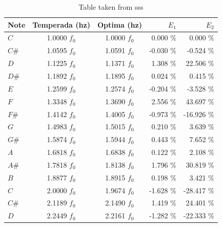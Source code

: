 \documentclass{article}
\begin{document}
\begin{table}[h]
\center
\begin{tabular}{|l||c|c||r|r|}
\hline 
Note & Temperada (hz)& Optima (hz) & $E_1$ & $E_2$ \\ \hline
\hline 
    $C$ & 1.0000 $f_0$ & 1.0000 $f_0$ &  0.000 \% &   0.000 \% \\ \hline 
  $C\#$ & 1.0595 $f_0$ & 1.0591 $f_0$ & -0.030 \% &  -0.524 \% \\ \hline 
    $D$ & 1.1225 $f_0$ & 1.1371 $f_0$ &  1.308 \% &  22.506 \% \\ \hline 
  $D\#$ & 1.1892 $f_0$ & 1.1895 $f_0$ &  0.024 \% &   0.415 \% \\ \hline 
    $E$ & 1.2599 $f_0$ & 1.2574 $f_0$ & -0.204 \% &  -3.528 \% \\ \hline 
    $F$ & 1.3348 $f_0$ & 1.3690 $f_0$ &  2.556 \% &  43.697 \% \\ \hline 
  $F\#$ & 1.4142 $f_0$ & 1.4005 $f_0$ & -0.973 \% & -16.926 \% \\ \hline 
    $G$ & 1.4983 $f_0$ & 1.5015 $f_0$ &  0.210 \% &   3.639 \% \\ \hline 
  $G\#$ & 1.5874 $f_0$ & 1.5944 $f_0$ &  0.443 \% &   7.652 \% \\ \hline 
    $A$ & 1.6818 $f_0$ & 1.6838 $f_0$ &  0.122 \% &   2.108 \% \\ \hline 
  $A\#$ & 1.7818 $f_0$ & 1.8138 $f_0$ &  1.796 \% &  30.819 \% \\ \hline 
    $B$ & 1.8877 $f_0$ & 1.8915 $f_0$ &  0.198 \% &   3.421 \% \\ \hline 
    $C$ & 2.0000 $f_0$ & 1.9674 $f_0$ & -1.628 \% & -28.417 \% \\ \hline 
  $C\#$ & 2.1189 $f_0$ & 2.1490 $f_0$ &  1.419 \% &  24.401 \% \\ \hline 
    $D$ & 2.2449 $f_0$ & 2.2161 $f_0$ & -1.282 \% & -22.333 \% \\ \hline 
\end{tabular}
\vspace{5pt}
\caption{Table taken from sss}
\label{table:res}
\end{table}
\end{document}

